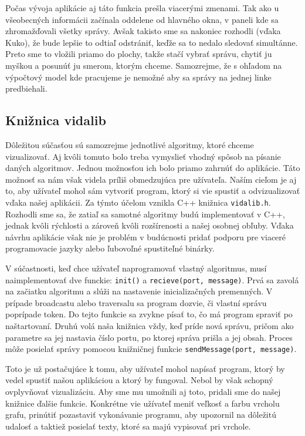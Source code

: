Počas vývoja aplikácie aj táto funkcia prešla viacerými zmenami. Tak ako u všeobecných informácii
začínala oddelene od hlavného okna, v paneli kde sa zhromažďovali všetky správy. Avšak takisto sme sa
nakoniec rozhodli (vďaka Kuko), že bude lepšie to odtiaľ odstrániť, keďže sa to nedalo sledovať
simultánne. Preto sme to vložili priamo do plochy, takže stačí vybrať správu, chytiť ju myškou a
posunúť ju smerom, ktorým chceme. Samozrejme, že s ohľadom na výpočtový model kde pracujeme je
nemožné aby sa správy na jednej linke predbiehali.

\subsection{Knižnica vidalib}

Dôležitou súčasťou sú samozrejme jednotlivé algoritmy, ktoré chceme vizualizovať. Aj kvôli tomuto bolo
treba vymyslieť vhodný spôsob na písanie daných algoritmov. Jednou možnosťou ich bolo priamo zahrnúť
do aplikácie. Táto možnosť sa nám však videla príliš obmedzujúca pre užívateľa. Naším cieľom je aj
to, aby užívateľ mohol sám vytvoriť program, ktorý si vie spustiť a odvizualizovať vďaka našej
aplikácii. Za týmto účelom vznikla C++ knižnica \verb!vidalib.h!. Rozhodli sme sa, že zatiaľ sa samotné
algoritmy budú implementovať v C++, jednak kvôli rýchlosti a zároveň kvôli rozšírenosti a našej
osobnej obľuby. Vďaka návrhu aplikácie však nie je problém v budúcnosti pridať podporu pre viaceré
programovacie jazyky alebo ľubovoľné spustiteľné binárky.

V súčastnosti, keď chce užívateľ naprogramovať vlastný algoritmus, musí naimplementovať dve funckie: \verb!init()! a
\verb!recieve(port, message)!. Prvá sa zavolá na začiatku algoritmu a slúži na nastavenie
inicializačných premenných. V prípade broadcastu alebo traversalu sa program dozvie, či vlastní správu poprípade token.
Do tejto funkcie sa zvykne písať to, čo má program spraviť po naštartovaní.
Druhú volá naša knižnica vždy, keď príde nová správu, pričom ako parametre sa jej nastavia číslo
portu, po ktorej správa prišla a jej obsah. Proces môže posielať správy pomocou knižničnej
funkcie \verb!sendMessage(port, message)!.

Toto je už postačujúce k tomu, aby užívateľ mohol napísať program, ktorý by vedel spustiť našou
aplikáciou a ktorý by fungoval. Nebol by však schopný ovplyvňovať vizualizáciu. Aby sme mu umožnili
aj toto, pridali sme do našej knižnice ďalšie funkcie. Konkrétne vie užívateľ meniť veľkosť a farbu
vrcholu grafu, prinútiť pozastaviť vykonávanie programu, aby upozornil na dôležitú udalosť a
taktiež posielať texty, ktoré sa majú vypisovať pri vrchole.

